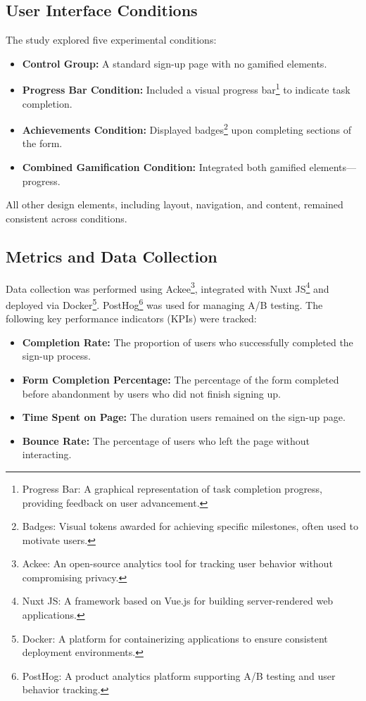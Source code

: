 \documentclass[conference]{IEEEtran}
\begin{document}
\subsection{User Interface Conditions}

The study explored five experimental conditions:

\begin{itemize}
    \item \textbf{Control Group:} A standard sign-up page with no gamified elements.
    \item \textbf{Progress Bar Condition:} Included a visual progress bar\footnote{Progress Bar: A graphical representation of task completion progress, providing feedback on user advancement.} to indicate task completion.
    \item \textbf{Achievements Condition:} Displayed badges\footnote{Badges: Visual tokens awarded for achieving specific milestones, often used to motivate users.} upon completing sections of the form.
    \item \textbf{Combined Gamification Condition:} Integrated both gamified elements—progress.
\end{itemize}

All other design elements, including layout, navigation, and content, remained consistent across conditions.

\subsection{Metrics and Data Collection}

Data collection was performed using Ackee\footnote{Ackee: An open-source analytics tool for tracking user behavior without compromising privacy.}, integrated with Nuxt JS\footnote{Nuxt JS: A framework based on Vue.js for building server-rendered web applications.} and deployed via Docker\footnote{Docker: A platform for containerizing applications to ensure consistent deployment environments.}. PostHog\footnote{PostHog: A product analytics platform supporting A/B testing and user behavior tracking.} was used for managing A/B testing. The following key performance indicators (KPIs) were tracked:

\begin{itemize}
    \item \textbf{Completion Rate:} The proportion of users who successfully completed the sign-up process.
    \item \textbf{Form Completion Percentage:} The percentage of the form completed before abandonment by users who did not finish signing up.
    \item \textbf{Time Spent on Page:} The duration users remained on the sign-up page.
    \item \textbf{Bounce Rate:} The percentage of users who left the page without interacting.
\end{itemize}
\end{document}
